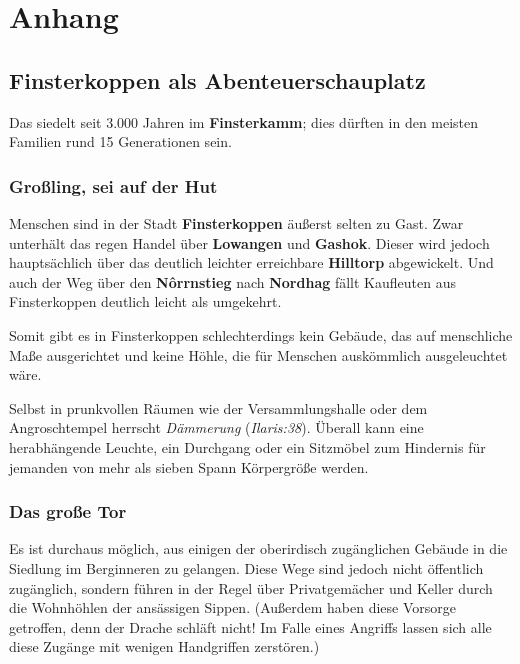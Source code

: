 \spaltenende
\section{Anhang}
\spaltenanfang




\subsection{Finsterkoppen als Abenteuer\-schauplatz}

Das \fkv siedelt seit 3.000 Jahren im \textbf{Finsterkamm}; dies dürften in den meisten Familien rund 15 Generationen sein.

\subsubsection{Großling, sei auf der Hut}
Menschen sind in der Stadt \textbf{Finsterkoppen} äußerst selten zu Gast. Zwar unterhält das \fkv regen Handel über \textbf{Lowangen} und \textbf{Gashok}.
Dieser wird jedoch hauptsächlich über das deutlich leichter erreichbare \textbf{Hilltorp} abgewickelt.
Und auch der Weg über den \textbf{N\^orrnstieg} nach \textbf{Nordhag} fällt Kaufleuten aus Finsterkoppen deutlich leicht als umgekehrt.

Somit gibt es in Finsterkoppen schlechterdings kein Gebäude, das auf menschliche Maße ausgerichtet und keine Höhle, die für Menschen auskömmlich ausgeleuchtet wäre.

Selbst in prunkvollen Räumen wie der Versammlungshalle oder dem Angroschtempel herrscht \emph{Dämmerung} (\emph{Ilaris:38}).
Überall kann eine herabhängende Leuchte, ein Durchgang oder ein Sitzmöbel zum Hindernis für jemanden von mehr als sieben Spann Körpergröße werden.

\subsubsection{Das große Tor}
Es ist durchaus möglich, aus einigen der oberirdisch zugänglichen Gebäude in die Siedlung im Berginneren zu gelangen.
Diese Wege sind jedoch nicht öffentlich zugänglich, sondern führen in der Regel über Privatgemächer und Keller durch die Wohnhöhlen der ansässigen Sippen. 
(Außerdem haben diese Vorsorge getroffen, denn der Drache schläft nicht! Im Falle eines Angriffs lassen sich alle diese Zugänge mit wenigen Handgriffen zerstören.)

